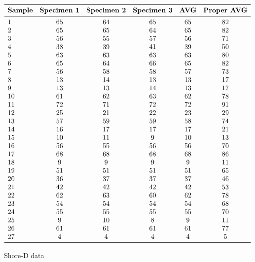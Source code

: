 \documentclass[a4paper, 11pt]{article}
\begin{document}
\begin{appendices}
\begin{table}[htp]
	\centering
	$
	\begin{array}{lccccc}
	\toprule
	\textbf{Sample} & \textbf{Specimen 1} & \textbf{Specimen 2} & \textbf{Specimen 3} & \textbf{AVG} & \textbf{Proper AVG} \\
	\midrule
	1&65&64&65&65&82\\
2&65&65&64&65&82\\
3&56&55&57&56&71\\
4&38&39&41&39&50\\
5&63&63&63&63&80\\
6&65&64&66&65&82\\
7&56&58&58&57&73\\
8&13&14&13&13&17\\
9&13&13&14&13&17\\
10&61&62&63&62&78\\
11&72&71&72&72&91\\
12&25&21&22&23&29\\
13&57&59&59&58&74\\
14&16&17&17&17&21\\
15&10&11&9&10&13\\
16&56&55&56&56&70\\
17&68&68&68&68&86\\
18&9&9&9&9&11\\
19&51&51&51&51&65\\
20&36&37&37&37&46\\
21&42&42&42&42&53\\
22&62&63&60&62&78\\
23&54&54&54&54&68\\
24&55&55&55&55&70\\
25&9&10&8&9&11\\
26&61&61&61&61&77\\
27&4&4&4&4&5\\
	\bottomrule
	\end{array}
	$
	\caption{Shore-D data}
	\label{tab:shored}
\end{table}


\end{appendices}
\end{document}
